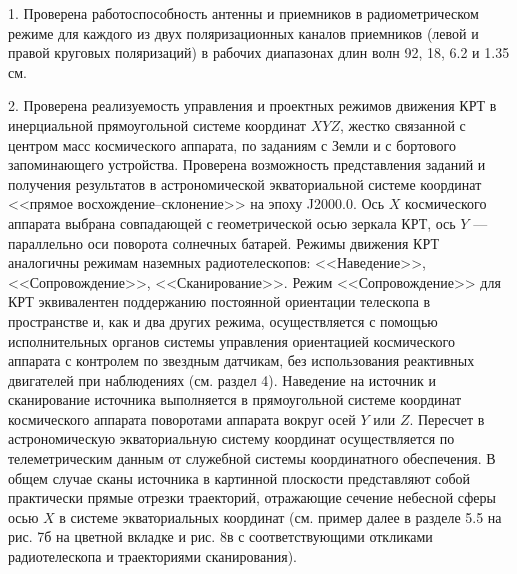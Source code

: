 1. Проверена работоспособность антенны и
приемников в радиометрическом режиме для каждого
из двух поляризационных каналов приемников (левой и правой круговых поляризаций)
в рабочих диапазонах длин волн 92, 18, 6.2 и 1.35 см.

2. Проверена реализуемость управления и проектных режимов движения КРТ в
инерциальной прямоугольной системе координат $XYZ$, жестко связанной с центром масс
космического аппарата, по заданиям с Земли и с бортового запоминающего
устройства. Проверена возможность представления заданий и получения
результатов в астрономической экваториальной системе координат
<<прямое восхождение--склонение>> на эпоху J2000.0. Ось $X$
 космического
аппарата выбрана совпадающей с геометрической осью зеркала КРТ,
ось $Y$ --- параллельно оси поворота солнечных батарей.
Режимы движения КРТ аналогичны режимам наземных радиотелескопов:
<<Наведение>>, <<Сопровождение>>, <<Сканирование>>.
Режим <<Сопровождение>> для КРТ эквивалентен поддержанию постоянной ориентации
телескопа в пространстве и, как и два других режима, осуществляется
с помощью исполнительных органов системы управления ориентацией
космического аппарата с контролем по звездным датчикам,
без использования реактивных двигателей при наблюдениях (см. раздел 4).
Наведение на источник и сканирование источника выполняется в прямоугольной
системе координат космического аппарата поворотами аппарата вокруг осей $Y$ или $Z$.
Пересчет в астрономическую экваториальную систему координат
осуществляется по телеметрическим данным от служебной
системы координатного обеспечения.
В общем случае сканы источника в картинной плоскости представляют
собой практически прямые отрезки траекторий, отражающие сечение
небесной сферы осью $X$
в системе экваториальных координат
(см. пример далее в разделе 5.5 на рис.   7б на цветной вкладке и рис. 8в с соответствующими
откликами радиотелескопа и
траекториями сканирования).

